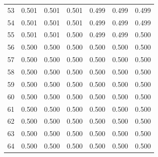 \documentclass[]{elsarticle}
\begin{document}
\begin{appendix}
\begin{table}[H]
\begin{tabular}[c]{lcccccc}
53&0.501&0.501&0.501&0.499&0.499&0.499\\
54&0.501&0.501&0.501&0.499&0.499&0.499\\
55&0.501&0.501&0.500&0.499&0.499&0.500\\
56&0.500&0.500&0.500&0.500&0.500&0.500\\
57&0.500&0.500&0.500&0.500&0.500&0.500\\
58&0.500&0.500&0.500&0.500&0.500&0.500\\
59&0.500&0.500&0.500&0.500&0.500&0.500\\
60&0.500&0.500&0.500&0.500&0.500&0.500\\
61&0.500&0.500&0.500&0.500&0.500&0.500\\
62&0.500&0.500&0.500&0.500&0.500&0.500\\
63&0.500&0.500&0.500&0.500&0.500&0.500\\
64&0.500&0.500&0.500&0.500&0.500&0.500\\
		\hline
	\end{tabular}
\end{table}


\end{appendix}
\end{document}
